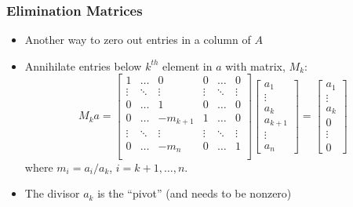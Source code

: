 \documentclass[10pt]{beamer}
\begin{document}
\begin{frame}
\frametitle{Elimination Matrices}
\begin{itemize}
\item Another way to zero out entries in a column of $A$
\item Annihilate entries below $k^{th}$ element in $a$ with matrix, $M_k$:
\[
M_k a = 
\begin{bmatrix}
1 & \dots & 0 & 0 & \dots & 0\\
\vdots & \ddots & \vdots & \vdots & \ddots & \vdots \\
0 & \dots & 1 & 0 & \dots & 0\\
0 & \dots & -m_{k+1} & 1 & \dots & 0\\
\vdots & \ddots & \vdots & \vdots & \ddots & \vdots \\
0 & \dots & -m_{n} & 0 & \dots & 1\\
\end{bmatrix}
\begin{bmatrix}
a_1 \\ \vdots \\ a_k \\ a_{k+1}\\ \vdots \\ a_n
\end{bmatrix}
=
\begin{bmatrix}
a_1 \\ \vdots \\ a_k \\ 0\\ \vdots \\ 0
\end{bmatrix}
\]
where $m_i = a_i/a_k$, $i=k+1,\dots,n$.
\item The divisor $a_k$ is the ``pivot'' (and needs to be nonzero)
\end{itemize}
\end{frame}
\end{document}
